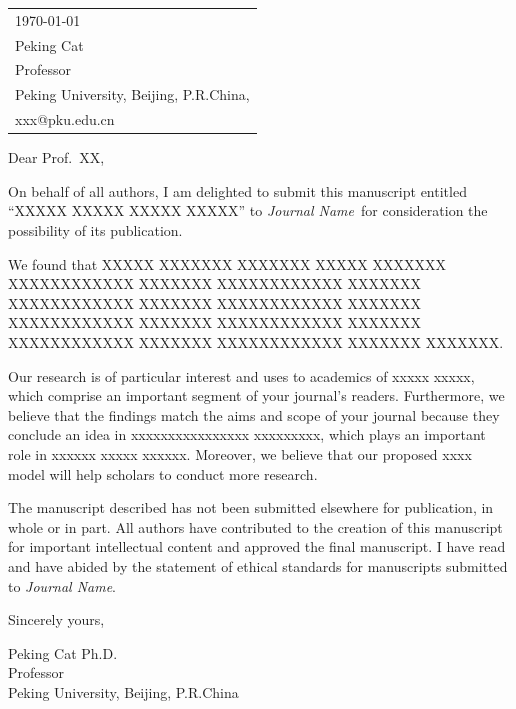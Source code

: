 \documentclass{article}
\newcommand{\journalname}{\textit{Journal Name}}
\begin{document}
\vspace*{30pt} %
\hfill
\begin{tabular}{l @{}}
\hfill \today \bigskip\\ %
\hfill Peking Cat \\
\hfill Professor \\
\hfill Peking University, Beijing, P.R.China,\\
\hfill xxx@pku.edu.cn \\
\end{tabular}


\bigskip %

Dear Prof.\ XX,

\bigskip %


On behalf of all authors, I am delighted to submit this manuscript entitled “XXXXX XXXXX XXXXX XXXXX” to \journalname\ for consideration the possibility of its publication.

We found that XXXXX XXXXXXX XXXXXXX XXXXX XXXXXXX XXXXXXXXXXXX XXXXXXX XXXXXXXXXXXX XXXXXXX XXXXXXXXXXXX XXXXXXX XXXXXXXXXXXX XXXXXXX XXXXXXXXXXXX XXXXXXX XXXXXXXXXXXX XXXXXXX XXXXXXXXXXXX XXXXXXX XXXXXXXXXXXX XXXXXXX XXXXXXX.
 
Our research is of particular interest and uses to academics of xxxxx xxxxx, which comprise an important segment of your journal's readers. Furthermore, we believe that the findings match the aims and scope of your journal because they conclude an idea in xxxxxxxxxxxxxxxx xxxxxxxxx, which plays an important role in xxxxxx xxxxx xxxxxx. Moreover, we believe that our proposed xxxx model will help scholars to conduct more research.

The manuscript described has not been submitted elsewhere for publication, in whole or in part. All authors have contributed to the creation of this manuscript for important intellectual content and approved the final manuscript. I have read and have abided by the statement of ethical standards for manuscripts submitted to \journalname.

\bigskip %

Sincerely yours,

\vspace{20pt} %

Peking Cat Ph.D.\\
Professor\\
Peking University, Beijing, P.R.China
\end{document}
